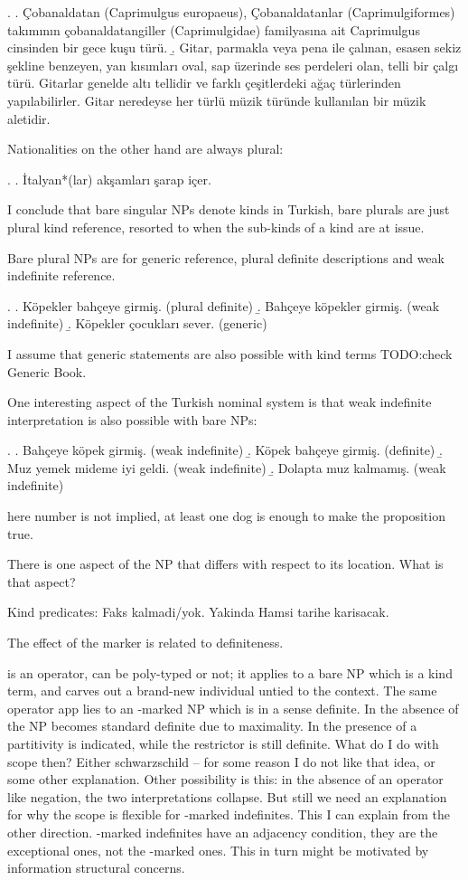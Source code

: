 \documentclass[11pt,a4paper]{article}
\begin{document}
\ex.
\a. Çobanaldatan (Caprimulgus europaeus), Çobanaldatanlar (Caprimulgiformes) takımının çobanaldatangiller (Caprimulgidae) familyasına ait Caprimulgus cinsinden bir gece kuşu türü.
\b. Gitar, parmakla veya pena ile çalınan, esasen sekiz şekline benzeyen, yan kısımları oval, sap üzerinde ses perdeleri olan, telli bir çalgı türü. Gitarlar genelde altı tellidir ve farklı çeşitlerdeki ağaç türlerinden yapılabilirler. Gitar neredeyse her türlü müzik türünde kullanılan bir müzik aletidir. 


Nationalities on the other hand are always plural:

\ex.
\a. İtalyan*(lar) akşamları şarap içer.

I conclude that bare singular NPs denote kinds in Turkish, bare plurals are just plural kind reference, resorted to when the sub-kinds of a kind are at issue.

Bare plural NPs are for generic reference, plural definite descriptions and weak indefinite reference.

\ex.
\a. Köpekler bahçeye girmiş. (plural definite)
\b. Bahçeye köpekler girmiş. (weak indefinite)
\b. Köpekler çocukları sever. (generic)

I assume that generic statements are also possible with kind terms TODO:check Generic Book.

One interesting aspect of the Turkish nominal system is that weak indefinite interpretation is also possible with bare NPs: 

\ex.
\a. Bahçeye köpek girmiş. (weak indefinite)
\b. Köpek bahçeye girmiş. (definite)
\b. Muz yemek mideme iyi geldi. (weak indefinite)
\b. Dolapta muz kalmamış. (weak indefinite)

here number is not implied, at least one dog is enough to make the proposition true.

There is one aspect of the NP that differs with respect to its location. What is that aspect?

Kind predicates:
Faks kalmadi/yok.
Yakinda Hamsi tarihe karisacak.



The effect of the marker is related to definiteness.

 is an operator, can be poly-typed or not; it applies to a bare NP which is a kind term, and carves out a brand-new individual untied to the context. The same operator app		 lies to an \acc-marked NP which is in a sense definite. In the absence of  the NP becomes standard definite due to maximality. In the presence of  a partitivity is indicated, while the restrictor is still definite. What do I do with scope then? Either schwarzschild -- for some reason I do not like that idea, or some other explanation. Other possibility is this: in the absence of an operator like negation, the two interpretations collapse. But still we need an explanation for why the scope is flexible for \acc-marked indefinites. This I can explain from the other direction. \zero-marked indefinites have an adjacency condition, they are the exceptional ones, not the \acc-marked ones. This in turn might be motivated by information structural concerns.    
\end{document}
